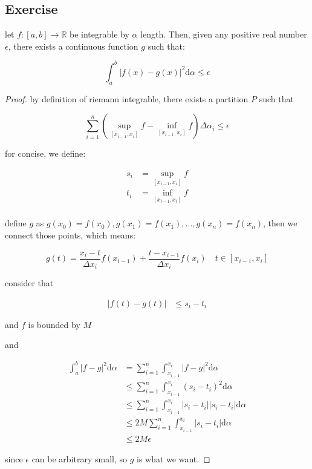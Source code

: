 \subsection{Exercise}

\begin{exercise}
    let $f: [a,b] \to \mathbb{R}$ be integrable by $\alpha$ length.
    Then, given any positive real number $\epsilon$, there exists a continuous function $g$ such that:

    \[
        \int_a^{b} \left| f(x) - g(x) \right|^2 \mathrm{d} \alpha \le \epsilon 
    \]
\end{exercise}

\begin{proof}
   by definition of riemann integrable, there exists a partition $P$ such that 

   \[
    \sum_{i=1}^{n} \left( \sup_{[x_{i-1},x_i]}f -\inf_{[x_{i-1},x_i]}f \right) \Delta \alpha_i \le \epsilon
   \]

   for concise, we define:

   \begin{align*}
    s_i &= \sup_{[x_{i-1},x_i]}f \\
    t_i &= \inf_{[x_{i-1},x_i]}f \\
   \end{align*}

   define $g$ as $g(x_0) = f(x_0), g(x_1) = f(x_1), ..., g(x_n) = f(x_n)$, then we connect those points, which means:

   \[
        g(t) = \frac{x_i - t}{\Delta x_i}f(x_{i-1}) + \frac{t-x_{i-1}}{\Delta x_i}f(x_{i}) \quad t \in [x_{i-1}, x_i]
   \]

   consider that 
   
   \begin{align*}
   |f(t) - g(t)| &\le s_i - t_i
   \end{align*}

   and $f$ is bounded by $M$

   and

   \begin{align*}
    \int_{a}^{b} \left|f - g\right|^2 \mathrm{d} \alpha &= \sum_{i=1}^{n}\int_{x_{i-1}}^{x_i} \left|f - g\right|^2 \mathrm{d} \alpha \\
    & \le \sum_{i=1}^{n}\int_{x_{i-1}}^{x_i} \left(s_i - t_i \right)^2 \mathrm{d} \alpha \\
    & \le \sum_{i=1}^{n}\int_{x_{i-1}}^{x_i} \left|s_i - t_i \right| \left| s_i - t_i\right| \mathrm{d} \alpha \\
    & \le 2M \sum_{i=1}^{n}\int_{x_{i-1}}^{x_i}  \left| s_i - t_i\right| \mathrm{d} \alpha \\
    & \le 2M \epsilon
   \end{align*}

   since $\epsilon$ can be arbitrary small, so $g$ is what we want.
\end{proof}